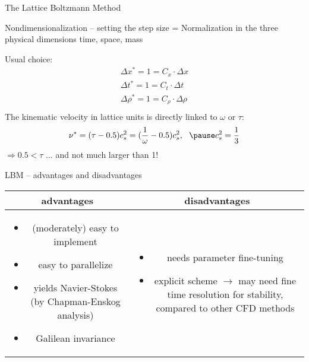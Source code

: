 \documentclass[aspectratio=43,t]{beamer}
\begin{document}
\begin{section}{The Lattice Boltzmann Method}
	\begin{frame}{Nondimensionalization -- setting the step size}
		= Normalization in the three physical dimensions time, space, mass \newline
		\par\bigskip
		\pause
		Usual choice:
		\begin{align*}
			\Delta x^*  = 1 = C_x \cdot \Delta x\\ 
			\Delta t^* = 1 = C_t \cdot \Delta t\\ 
			\Delta \rho^* = 1 = C_\rho \cdot \Delta \rho\\ 
		\end{align*}
		\pause
		The kinematic velocity in lattice units is directly linked to $\omega$ or $\tau$: \pause
		\begin{align*}
			\nu^* = (\tau - 0.5 ) c_{s}^{2} = (\frac{1}{\omega} - 0.5 ) c_{s}^{2}, \,\,\,\,
			\pause
			c_{s}^{2} = \frac{1}{3}\\
		\end{align*}
		\centering
		$\Rightarrow 0.5 < \tau$  ... and not much larger than 1!
		\newline\par\smallskip
	\end{frame}
	
	\begin{frame}{LBM -- advantages and disadvantages}
		\centering
		\begin{tabular}{c c}
			\bfseries advantages & \bfseries disadvantages \\\hline
			\begin{minipage}{0.4\linewidth}
				\vspace{1ex}
				\begin{itemize}
					\pause
					\item (moderately) easy to implement
					\pause
					\item easy to parallelize
					\pause
					\item yields Navier-Stokes (by Chapman-Enskog analysis)
					\pause
					\item Galilean invariance
					\pause
				\end{itemize}
			\end{minipage}
			&\begin{minipage}{0.4\linewidth}
				\vspace{1ex}
				\begin{itemize}
					\item needs parameter fine-tuning
					\pause
					\item explicit scheme $\rightarrow$  may need fine time resolution for stability, compared to other CFD methods
				\end{itemize}
			\end{minipage}
		\end{tabular}
	\end{frame}
	
\end{section}
\end{document}

